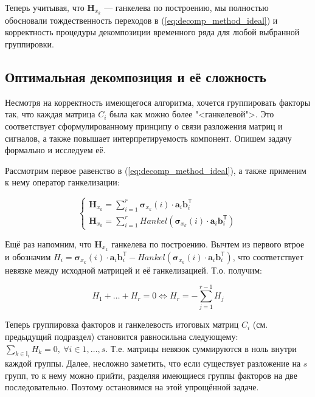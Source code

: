 	    	Теперь учитывая, что $ \mathbf{H}_{x_k} $ --- ганкелева по построению, мы полностью обосновали тождественность переходов в (\ref{eq:decomp_method_ideal}) и корректность процедуры декомпозиции временного ряда для любой выбранной группировки.
	    	
	    \subsection{Оптимальная декомпозиция и её сложность}\label{sec:optimal_decomp}
	    	
	    	Несмотря на корректность имеющегося алгоритма, хочется группировать факторы так, что каждая матрица $ C_i $ была как можно более "<ганкелевой">. Это соответствует сформулированному принципу о связи разложения матриц и сигналов, а также повышает интерпретируемость компонент. Опишем задачу формально и исследуем её.
	    	
	    	Рассмотрим первое равенство в (\ref{eq:decomp_method_ideal}), а также применим к нему оператор ганкелизации:
	    	
	    	\begin{equation*}
	    		\begin{cases*}
	    			\mathbf{H}_{x_k} = \sum\limits_{i = 1}^{r} \boldsymbol{\sigma}_{x_k}(i) \cdot \mathbf{a}_i  \mathbf{b}_i^{\mathsf{T}} \\
	    			\mathbf{H}_{x_k} = \sum\limits_{i = 1}^{r} Hankel(\boldsymbol{\sigma}_{x_k}(i) \cdot \mathbf{a}_i  \mathbf{b}_i^{\mathsf{T}})
	    		\end{cases*}
	    	\end{equation*}
	    	
	    	Ещё раз напомним, что $ \mathbf{H}_{x_k} $ ганкелева по построению. Вычтем из первого втрое и обозначим $ H_i = \boldsymbol{\sigma}_{x_k}(i) \cdot \mathbf{a}_i  \mathbf{b}_i^{\mathsf{T}} - Hankel(\boldsymbol{\sigma}_{x_k}(i) \cdot \mathbf{a}_i  \mathbf{b}_i^{\mathsf{T}}) $, что соответствует невязке между исходной матрицей и её ганкелизацией. Т.о. получим:
	    	
	    	\begin{equation}\label{eq:residuals_equation}
	    		H_1 + \ldots + H_r = 0 \Leftrightarrow H_r = - \sum\limits_{j = 1}^{r - 1} H_j
	    	\end{equation}
	    	
	    	Теперь группировка факторов и ганкелевость итоговых матриц $ C_i $ (см. предыдущий подраздел) становится равносильна следующему: $ \sum_{k \in \mathbb{I}_i} H_k = 0, \  \forall i \in 1, \ldots, s $. Т.е. матрицы невязок суммируются в ноль внутри каждой группы. Далее, несложно заметить, что если существует разложение на $ s $ групп, то к нему можно прийти, разделяя имеющиеся группы факторов на две последовательно. Поэтому остановимся на этой упрощённой задаче.
	    	
